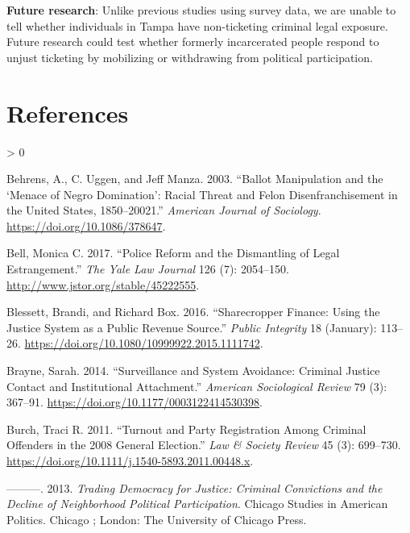 \documentclass[
  12pt,
]{article}
\newlength{\cslhangindent}
\newenvironment{CSLReferences}[2] %
 {%
  \setlength{\parindent}{0pt}
  \ifodd #1 \everypar{\setlength{\hangindent}{\cslhangindent}}\ignorespaces\fi
  \ifnum #2 > 0
  \setlength{\parskip}{#2\baselineskip}
  \fi
 }%
 {}
\begin{document}
\textbf{Future research}: Unlike previous studies using survey data, we are unable to tell whether individuals in Tampa have non-ticketing criminal legal exposure. Future research could test whether formerly incarcerated people respond to unjust ticketing by mobilizing or withdrawing from political participation.

\newpage

\hypertarget{references}{%
\section*{References}\label{references}}

\hypertarget{refs}{}
\begin{CSLReferences}{1}{0}
\leavevmode\hypertarget{ref-Behrens2003}{}%
Behrens, A., C. Uggen, and Jeff Manza. 2003. {``Ballot {Manipulation} and the {`{Menace} of {Negro Domination}'}: {Racial Threat} and {Felon Disenfranchisement} in the {United States}, 1850--20021.''} \emph{American Journal of Sociology}. \url{https://doi.org/10.1086/378647}.

\leavevmode\hypertarget{ref-Bell2017}{}%
Bell, Monica C. 2017. {``Police {Reform} and the {Dismantling} of {Legal Estrangement}.''} \emph{The Yale Law Journal} 126 (7): 2054--150. \url{http://www.jstor.org/stable/45222555}.

\leavevmode\hypertarget{ref-Blessett2016}{}%
Blessett, Brandi, and Richard Box. 2016. {``Sharecropper {Finance}: {Using} the {Justice System} as a {Public Revenue Source}.''} \emph{Public Integrity} 18 (January): 113--26. \url{https://doi.org/10.1080/10999922.2015.1111742}.

\leavevmode\hypertarget{ref-Brayne2014}{}%
Brayne, Sarah. 2014. {``Surveillance and {System Avoidance}: {Criminal Justice Contact} and {Institutional Attachment}.''} \emph{American Sociological Review} 79 (3): 367--91. \url{https://doi.org/10.1177/0003122414530398}.

\leavevmode\hypertarget{ref-Burch2011}{}%
Burch, Traci R. 2011. {``Turnout and {Party Registration} Among {Criminal Offenders} in the 2008 {General Election}.''} \emph{Law \& Society Review} 45 (3): 699--730. \url{https://doi.org/10.1111/j.1540-5893.2011.00448.x}.

\leavevmode\hypertarget{ref-Burch2013}{}%
---------. 2013. \emph{Trading Democracy for Justice: Criminal Convictions and the Decline of Neighborhood Political Participation}. Chicago Studies in {American} Politics. {Chicago ; London}: {The University of Chicago Press}.


\end{CSLReferences}
\end{document}
